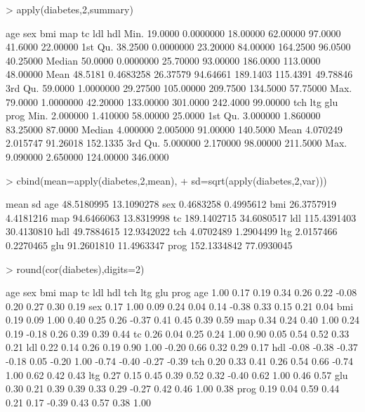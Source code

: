 \documentclass{article}
\begin{document}
\begin{Schunk}
\begin{Sinput}
> apply(diabetes,2,summary)
\end{Sinput}
\begin{Soutput}
            age       sex      bmi       map       tc      ldl      hdl
Min.    19.0000 0.0000000 18.00000  62.00000  97.0000  41.6000 22.00000
1st Qu. 38.2500 0.0000000 23.20000  84.00000 164.2500  96.0500 40.25000
Median  50.0000 0.0000000 25.70000  93.00000 186.0000 113.0000 48.00000
Mean    48.5181 0.4683258 26.37579  94.64661 189.1403 115.4391 49.78846
3rd Qu. 59.0000 1.0000000 29.27500 105.00000 209.7500 134.5000 57.75000
Max.    79.0000 1.0000000 42.20000 133.00000 301.0000 242.4000 99.00000
             tch      ltg       glu     prog
Min.    2.000000 1.410000  58.00000  25.0000
1st Qu. 3.000000 1.860000  83.25000  87.0000
Median  4.000000 2.005000  91.00000 140.5000
Mean    4.070249 2.015747  91.26018 152.1335
3rd Qu. 5.000000 2.170000  98.00000 211.5000
Max.    9.090000 2.650000 124.00000 346.0000
\end{Soutput}
\begin{Sinput}
> cbind(mean=apply(diabetes,2,mean), 
+       sd=sqrt(apply(diabetes,2,var)))
\end{Sinput}
\begin{Soutput}
            mean         sd
age   48.5180995 13.1090278
sex    0.4683258  0.4995612
bmi   26.3757919  4.4181216
map   94.6466063 13.8319998
tc   189.1402715 34.6080517
ldl  115.4391403 30.4130810
hdl   49.7884615 12.9342022
tch    4.0702489  1.2904499
ltg    2.0157466  0.2270465
glu   91.2601810 11.4963347
prog 152.1334842 77.0930045
\end{Soutput}
\begin{Sinput}
> round(cor(diabetes),digits=2)
\end{Sinput}
\begin{Soutput}
       age   sex   bmi   map   tc   ldl   hdl   tch   ltg   glu  prog
age   1.00  0.17  0.19  0.34 0.26  0.22 -0.08  0.20  0.27  0.30  0.19
sex   0.17  1.00  0.09  0.24 0.04  0.14 -0.38  0.33  0.15  0.21  0.04
bmi   0.19  0.09  1.00  0.40 0.25  0.26 -0.37  0.41  0.45  0.39  0.59
map   0.34  0.24  0.40  1.00 0.24  0.19 -0.18  0.26  0.39  0.39  0.44
tc    0.26  0.04  0.25  0.24 1.00  0.90  0.05  0.54  0.52  0.33  0.21
ldl   0.22  0.14  0.26  0.19 0.90  1.00 -0.20  0.66  0.32  0.29  0.17
hdl  -0.08 -0.38 -0.37 -0.18 0.05 -0.20  1.00 -0.74 -0.40 -0.27 -0.39
tch   0.20  0.33  0.41  0.26 0.54  0.66 -0.74  1.00  0.62  0.42  0.43
ltg   0.27  0.15  0.45  0.39 0.52  0.32 -0.40  0.62  1.00  0.46  0.57
glu   0.30  0.21  0.39  0.39 0.33  0.29 -0.27  0.42  0.46  1.00  0.38
prog  0.19  0.04  0.59  0.44 0.21  0.17 -0.39  0.43  0.57  0.38  1.00
\end{Soutput}
\end{Schunk}
\end{document}

